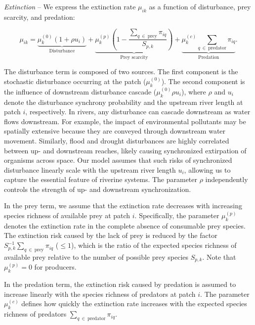 \documentclass[11pt, class=article, crop=false]{standalone}
\begin{document}
\textit{Extinction} -- 
We express the extinction rate $\mu_{ik}$ as a function of disturbance, prey scarcity, and predation:

\begin{equation}
    \mu_{ik} = 
        \underbrace{\mu_{k}^{(0)} (1 + \rho u_i)}_{\text{Disturbance}} + 
        \underbrace{\mu_{k}^{(p)} \left(1 - \frac{\sum_{q~\in~\text{prey}} \pi_{iq}}{S_{p, k}} \right)}_{\text{Prey scarcity}} + 
        \underbrace{\mu_{k}^{(c)} \sum_{q~\in~\text{predator}} \pi_{iq}}_{\text{Predation}}.
    \label{eq:extn}
\end{equation}

The disturbance term is composed of two sources.
The first component is the stochastic disturbance occurring at the patch ($\mu_{k}^{(0)}$).
The second component is the influence of downstream disturbance cascade ($\mu_{k}^{(0)} \rho u_i$), where $\rho$ and $u_i$ denote the disturbance synchrony probability and the upstream river length at patch $i$, respectively.
In rivers, any disturbance can cascade downstream as water flows downstream.
For example, the impact of environmental pollutants may be spatially extensive because they are conveyed through downstream water movement.
Similarly, flood and drought disturbances are highly correlated between up- and downstream reaches, likely causing synchronized extirpation of organisms across space.
Our model assumes that such risks of synchronized disturbance linearly scale with the upstream river length $u_i$, allowing us to capture the essential feature of riverine systems.
The parameter $\rho$ independently controls the strength of up- and downstream synchronization.

In the prey term, we assume that the extinction rate decreases with increasing species richness of available prey at patch $i$.
Specifically, the parameter $\mu_{k}^{(p)}$ denotes the extinction rate in the complete absence of consumable prey species.
The extinction risk caused by the lack of prey is reduced by the factor $S_{p, k}^{-1} \sum_{q~\in~\text{prey}} \pi_{iq}$ ($\le 1$), which is the ratio of the expected species richness of available prey relative to the number of possible prey species $S_{p, k}$.
Note that $\mu_{k}^{(p)} = 0$ for producers.

In the predation term, the extinction risk caused by predation is assumed to increase linearly with the species richness of predators at patch $i$.
The parameter $\mu_{k}^{(c)}$ defines how quickly the extinction rate increases with the expected species richness of predators $\sum_{q~\in~\text{predator}} \pi_{iq}$.
\end{document}
